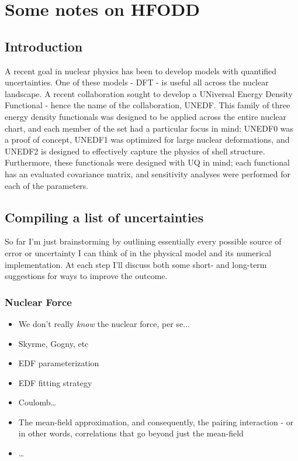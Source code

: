 \chapter{Some notes on HFODD}

\section{Introduction}
A recent goal in nuclear physics has been to develop models with quantified uncertainties. One of these models - DFT - is useful all across the nuclear landscape. A recent collaboration sought to develop a UNiversal Energy Density Functional - hence the name of the collaboration, UNEDF. This family of three energy density functionals was designed to be applied across the entire nuclear chart, and each member of the set had a particular focus in mind: UNEDF0 was a proof of concept, UNEDF1 was optimized for large nuclear deformations, and UNEDF2 is designed to effectively capture the physics of shell structure. Furthermore, these functionals were designed with UQ in mind; each functional has an evaluated covariance matrix, and sensitivity analyses were performed for each of the parameters.

\section{Compiling a list of uncertainties}
So far I'm just brainstorming by outlining essentially every possible source of error or uncertainty I can think of in the physical model and its numerical implementation. At each step I'll discuss both some short- and long-term suggestions for ways to improve the outcome.

\subsection{Nuclear Force}
\begin{itemize}
\item We don't really \textit{know} the nuclear force, per se...
\item Skyrme, Gogny, etc
\item EDF parameterization
\item EDF fitting strategy
\item Coulomb\dots
\item The mean-field approximation, and consequently, the pairing interaction - or in other words, correlations that go beyond just the mean-field
\item \dots
\end{itemize}

